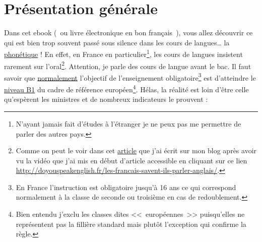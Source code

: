 \section{Présentation générale}\label{sec:pres}
Dans cet ebook (~ou livre électronique en bon français~), vous allez
découvrir ce qui est bien trop souvent passé sous silence dans les
cours de langues\ldots{} la \underline{phonétique} ! En effet, en France en
particulier\footnote{N'ayant jamais fait d'études à l'étranger je ne
  peux pas me permettre de parler des autres pays.}, les cours de
langues insistent rarement sur l'oral\footnote{Comme on peut le voir
  dans cet
  \href{http://doyouspeakenglish.fr/les-francais-savent-ils-parler-anglais/}{article}
  que j'ai écrit sur mon blog après avoir vu la vidéo que j'ai mis en
  début d'article accessible en cliquant sur ce lien 
  \url{http://doyouspeakenglish.fr/les-francais-savent-ils-parler-anglais/}.}. Attention, je parle des cours
de langue avant le bac. Il faut savoir que \underline{normalement}
l'objectif de l'enseignement obligatoire\footnote{En France
  l'instruction est obligatoire jusqu'à 16 ans ce qui correspond
  normalement à la classe de seconde ou troisième en cas de
  redoublement.} est d'atteindre le
\href{http://doyouspeakenglish.fr/quel-niveau-danglais-avez-vous/}{niveau
  B1} du cadre de référence européen\footnote{Bien entendu j'exclu les
classes dites <<~européennes~>> puisqu'elles ne représentent pas la
fillière standard mais plutôt l'exception qui confirme la règle.}. Hélas, la réalité est
loin d'être celle qu'espèrent les ministres et de nombreux indicateurs le prouvent :
